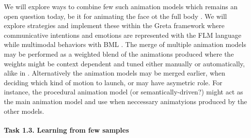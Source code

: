 We will explore ways to combine few such animation models which remains an open question today, be it for animating the face ot the full body \cite{...}. We will explore strategies and implement these within the Greta framework where communicative intentions and emotions are represented with the FLM language while multimodal behaviors with BML \cite{DBLP:conf/iva/VilhjalmssonCCCKKMMMPRTWW07}. The merge of multiple animation models may be performed as a weighted blend of the animations produced where the weights might be context dependent and tuned either manually or automatically, alike in \cite{DBLP:journals/tvcg/ShoulsonMKB14}. Alternatively the animation models may be merged earlier, when deciding which kind of motion to launch, or may have asymetric role. For instance, the procedural animation model (or semantically-driven?) might act as the main animation model and use when neccessary animatyions produced by the other models.




% 
% 

\paragraph{Task 1.3. Learning from few samples}

